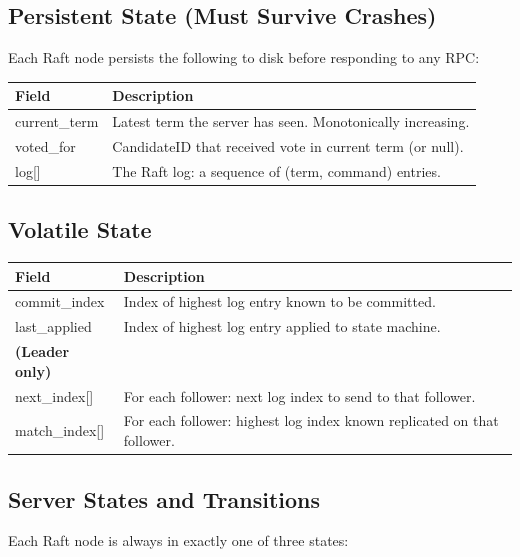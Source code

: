\documentclass[12pt,a4paper]{article}
\begin{document}
\subsection{Persistent State (Must Survive Crashes)}

Each Raft node persists the following to disk before responding to any RPC:

\begin{center}
\begin{tabular}{>{\ttfamily}p{3.5cm} p{8cm}}
\toprule
\normalfont\textbf{Field} & \textbf{Description} \\
\midrule
current\_term & Latest term the server has seen. Monotonically increasing. \\
voted\_for & CandidateID that received vote in current term (or null). \\
log[] & The Raft log: a sequence of (term, command) entries. \\
\bottomrule
\end{tabular}
\end{center}

\subsection{Volatile State}

\begin{center}
\begin{tabular}{>{\ttfamily}p{3.5cm} p{8cm}}
\toprule
\normalfont\textbf{Field} & \textbf{Description} \\
\midrule
commit\_index & Index of highest log entry known to be committed. \\
last\_applied & Index of highest log entry applied to state machine. \\
\normalfont\textbf{(Leader only)} & \\
next\_index[] & For each follower: next log index to send to that follower. \\
match\_index[] & For each follower: highest log index known replicated on that follower. \\
\bottomrule
\end{tabular}
\end{center}

\subsection{Server States and Transitions}

Each Raft node is always in exactly one of three states:
\end{document}
